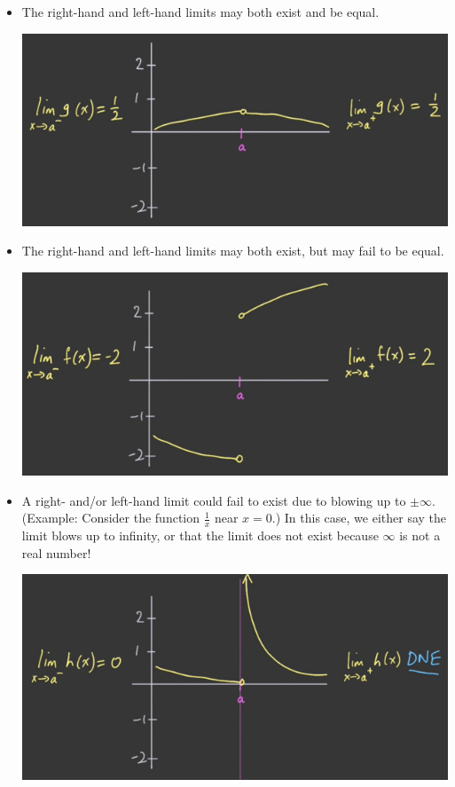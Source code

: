 \documentclass{article}
\begin{document}
\begin{itemize}
    \item The right-hand and left-hand limits may both exist and be equal.
    \begin{center}\includegraphics[scale = 0.35]{Images/PossibleBehavior1.png}\end{center}
    \item The right-hand and left-hand limits may both exist, but may fail to be equal.
    \begin{center}\includegraphics[scale = 0.35]{Images/PossibleBehavior2.png}\end{center}
    \item A right- and/or left-hand limit could fail to exist due to blowing up to $\pm\infty$.
    (Example: Consider the function $\frac{1}{x}$ near $x = 0$.) In this case, we either say the
    limit blows up to infinity, or that the limit does not exist because $\infty$ is not a real number!
    \begin{center}\includegraphics[scale = 0.35]{Images/PossibleBehavior3.png}\end{center}

\end{itemize}
\end{document}
